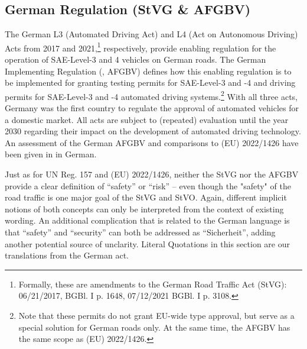\subsection{German Regulation (StVG \& AFGBV)}
\label{sec:afgbv}
The German L3 (Automated Driving Act) and L4 (Act on Autonomous Driving) Acts from 2017 and 2021,\footnote{Formally, these are amendments to the German Road Traffic Act (StVG): 06/21/2017, BGBl. I p. 1648, 07/12/2021 BGBl. I p. 3108.} respectively, provide enabling regulation for the operation of SAE-Level-3 and 4 vehicles on German roads.
The German Implementing Regulation (\parencite{afgbv}, AFGBV) defines how this enabling regulation is to be implemented for granting testing permits for SAE-Level-3 and -4 and driving permits for SAE-Level-3 and -4 automated driving systems.\footnote{Note that these permits do not grant EU-wide type approval, but serve as a special solution for German roads only. At the same time, the AFGBV has the same scope as (EU) 2022/1426.}
With all three acts, Germany was the first country to regulate the approval of automated vehicles for a domestic market.
All acts are subject to (repeated) evaluation until the year 2030 regarding their impact on the development of automated driving technology.
An assessment of the German AFGBV and comparisons to (EU) 2022/1426 have been given in \cite{steininger2022} in German.

Just as for UN Reg. 157 and (EU) 2022/1426, neither the StVG nor the AFGBV provide a clear definition of ``safety'' or ``risk'' -- even though the "safety" of the road traffic is one major goal of the StVG and StVO.
Again, different implicit notions of both concepts can only be interpreted from the context of existing wording.
An additional complication that is related to the German language is that ``safety'' and ``security'' can both be addressed as ``Sicherheit'', adding another potential source of unclarity.
Literal Quotations in this section are our translations from the German act.

